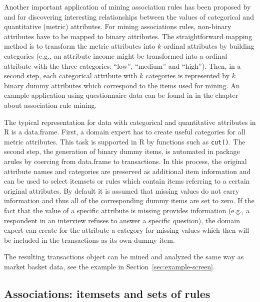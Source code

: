 \documentclass[10pt,a4paper]{article}
\newcommand{\strong}[1]{{\normalfont\fontseries{b}\selectfont #1}}
\newcommand{\class}[1]{\mbox{\textsf{#1}}}
\newcommand{\func}[1]{\mbox{\texttt{#1()}}}
\newcommand{\pkg}[1]{\strong{#1}}
\newcommand{\proglang}[1]{\textsf{#1}}
\begin{document}
Another important application of mining association rules has been
proposed by \cite{arules:Piatetsky-Shapiro:1991} and
\cite{arules:Srikant+Agrawal:1996} for discovering interesting
relationships between the values of categorical and quantitative
(metric) attributes.  For mining associations rules, non-binary
attributes have to be mapped to binary attributes. The straightforward
mapping method is to transform the metric attributes into $k$ ordinal
attributes by building categories (e.g., an attribute income might be
transformed into a ordinal attribute with the three categories: ``low'',
``medium'' and ``high'').  Then, in a second step, each categorical
attribute with $k$ categories is represented by $k$ binary dummy
attributes which correspond to the items used for mining.  An example
application using questionnaire data can be found in
\cite{arules:Hastie+Tibshirani+Friedman:2001} in the chapter
about association rule mining.

The typical representation for data with categorical and quantitative
attributes in \proglang{R} is a \class{data.frame}.  First, a domain
expert has to create useful categories for all metric attributes.  This
task is supported in \proglang{R} by functions such as \func{cut}.  The
second step, the generation of binary dummy items, is automated in
package \pkg{arules} by coercing from \class{data.frame} to
\class{transactions}.  In this process, the original attribute names and
categories are preserved as additional item information and can be used
to select itemsets or rules which contain items referring to a certain
original attributes.
By default it is assumed that missing values do not carry information and thus
all of the corresponding dummy items are set to zero.  
If the fact
that the value of a specific attribute is missing provides information 
(e.g., a respondent in an interview refuses to answer a specific question), 
the domain expert can create for the attribute a category for missing values 
which then will be included in the transactions as its own dummy item.

The resulting \class{transactions} object can be
mined and analyzed the same way as market basket data, see the example
in Section~\ref{sec:example-screen}.


\subsection{Associations: itemsets and sets of rules\label{sec:associations}}
\end{document}
